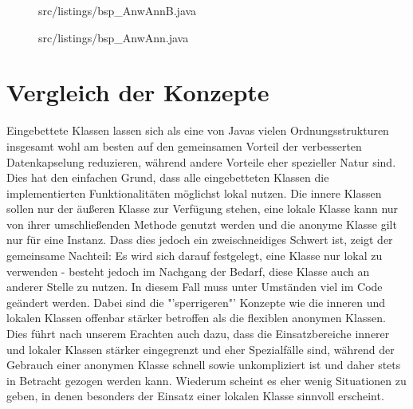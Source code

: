 \begin{figure}[H]
\lstset{language=Java}
 {src/listings/bsp_AnwAnnB.java}
\end{figure}
\newpage

\begin{figure}[H]
\lstset{language=Java}
 {src/listings/bsp_AnwAnn.java}
\end{figure}
\newpage

\section{Vergleich der Konzepte}

Eingebettete Klassen lassen sich als eine von Javas vielen Ordnungsstrukturen insgesamt wohl am besten auf den gemeinsamen Vorteil der verbesserten Datenkapselung reduzieren, während andere Vorteile eher spezieller Natur sind.
Dies hat den einfachen Grund, dass alle eingebetteten Klassen die implementierten Funktionalitäten möglichst lokal nutzen. Die innere Klassen sollen nur der äußeren Klasse zur Verfügung stehen,
eine lokale Klasse kann nur von ihrer umschließenden Methode genutzt werden und die anonyme Klasse gilt nur für eine Instanz. Dass dies jedoch ein zweischneidiges Schwert ist, zeigt der gemeinsame Nachteil:
Es wird sich darauf festgelegt, eine Klasse nur lokal zu verwenden - besteht jedoch im Nachgang der Bedarf, diese Klasse auch an anderer Stelle zu nutzen. In diesem Fall muss unter Umständen viel im Code geändert werden.
Dabei sind die "'sperrigeren"' Konzepte wie die inneren und lokalen Klassen offenbar stärker betroffen als die flexiblen anonymen Klassen.
Dies führt nach unserem Erachten auch dazu, dass die Einsatzbereiche innerer und lokaler Klassen stärker eingegrenzt und eher Spezialfälle sind, während der Gebrauch einer anonymen Klasse
schnell sowie unkompliziert ist und daher stets in Betracht gezogen werden kann. Wiederum scheint es eher wenig Situationen zu geben, in denen besonders der Einsatz einer lokalen Klasse sinnvoll erscheint.
